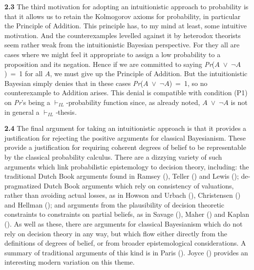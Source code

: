 \documentclass[
  11pt,
  letterpaper,
  DIV=11,
  numbers=noendperiod,
  oneside]{scrartcl}
\begin{document}
\textbf{2.3} The third motivation for adopting an intuitionistic
approach to probability is that it allows us to retain the Kolmogorov
axioms for probability, in particular the Principle of Addition. This
principle has, to my mind at least, some intuitive motivation. And the
counterexamples levelled against it by heterodox theorists seem rather
weak from the intuitionistic Bayesian perspective. For they all are
cases where we might feel it appropriate to assign a low probability to
a proposition and its negation.
Hence if we are committed to saying
\emph{Pr}(\(A\)~\({\vee}\)~\({\lnot}\)\(A\))~=~1 for all \(A\), we must
give up the Principle of Addition. But the intuitionistic Bayesian
simply denies that in these cases
\emph{Pr}(\(A\)~\({\vee}\)~\({\lnot}\)\(A\))~=~1, so no counterexample
to Addition arises. This denial is compatible with condition (P1) on
\emph{Pr}'s being a \(\vdash_{IL}\)-probability function since, as
already noted, \(A\)~\({\vee}\)~\({\lnot}\)\(A\) is not in general a
\(\vdash_{IL}\)\emph{-}thesis\emph{.}

\textbf{2.4} The final argument for taking an intuitionistic approach is
that it provides a justification for rejecting the positive arguments
for classical Bayesianism. These provide a justification for requiring
coherent degrees of belief to be representable by the classical
probability calculus. There are a dizzying variety of such arguments
which link probabilistic epistemology to decision theory, including: the
traditional Dutch Book arguments found in Ramsey
(), Teller
() and Lewis
(); de-pragmatized Dutch Book arguments
which rely on consistency of valuations, rather than avoiding actual
losses, as in Howson and Urbach (),
Christensen () and Hellman
(); and arguments from the plausibility
of decision theoretic constraints to constraints on partial beliefs, as
in Savage (), Maher
() and Kaplan
(). As well as these, there are arguments
for classical Bayesianism which do not rely on decision theory in any
way, but which flow either directly from the definitions of degrees of
belief, or from broader epistemological considerations. A summary of
traditional arguments of this kind is in Paris
(). Joyce ()
provides an interesting modern variation on this theme.
\end{document}
